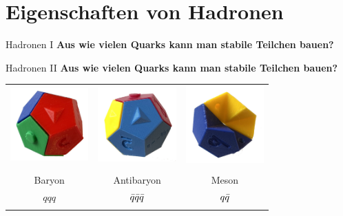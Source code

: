 \section{Eigenschaften von Hadronen}
\begin{frame}{Hadronen I}
     \hspace{0.2cm} \textbf{Aus wie vielen Quarks kann man stabile Teilchen bauen?} \\
    \end{frame}
 \begin{frame}{Hadronen II}
 \textbf{Aus wie vielen Quarks kann man stabile Teilchen bauen?}
\begin{table}[]
    \centering
    \begin{tabular}{ccc}
        \includegraphics[width=3cm]{Figures Lecture on Hadrons/QuarkPuzzle_Baryon.jpg}&\includegraphics[width=3cm]{Figures Lecture on Hadrons/QuarkPuzzle_Antibaryon.jpg}&\includegraphics[width=3cm]{Figures Lecture on Hadrons/QuarkPuzzle_Meson.jpg} \\
        &&\\
        Baryon &   Antibaryon  & Meson    \\
        $qqq$ &  $\Bar{q}\Bar{q}\Bar{q} $&$ q\Bar{q}$ \\
        &&\\

\end{tabular}
\end{table}
\end{frame}

